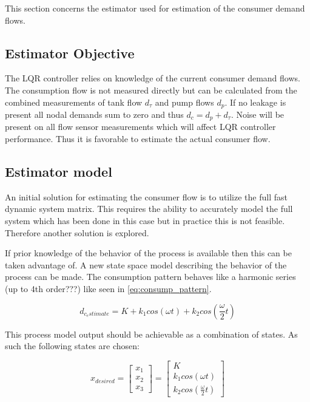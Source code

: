 This section concerns the estimator used for estimation of the consumer demand flows.

\subsection{Estimator Objective}
The LQR controller relies on knowledge of the current  consumer demand flows. The consumption flow is not measured directly but can be calculated from the combined measurements of tank flow $d_\tau$ and pump flows $d_p$. If no leakage is present all nodal demands sum to zero and thus $d_c = d_p + d_\tau$.  Noise will be present on all flow sensor measurements which will affect LQR controller performance. Thus it is favorable to estimate the actual consumer flow.

\subsection{Estimator model}
An initial solution for estimating the consumer flow is to utilize the full fast dynamic system matrix. This requires the ability to accurately model the full system which has been done in this case but in practice this is not feasible. Therefore another solution is explored.

If prior knowledge of the behavior of the process is available then this can be taken advantage of. A new state space model describing the behavior of the process can be made. The consumption pattern behaves like a harmonic series (up to 4th order???) like seen in \cref{eq:consump_pattern}.

\begin{equation} \label{eq:consump_pattern}
	d_{c_estimate} = K + k_1 cos(\omega t) + k_2 cos(\frac{\omega}{2} t)
\end{equation}



This process model output should be achievable as a combination of states. As such the following states are chosen:

\begin{equation} \label{eq:consump_x}
	x_{desired} =  \begin{bmatrix}
		x_1 \\
		x_2 \\
		x_3
	\end{bmatrix}
	=
	\begin{bmatrix}
		K \\
		k_1 cos(\omega t) \\
		k_2 cos(\frac{\omega}{2} t)
	\end{bmatrix}
\end{equation}

